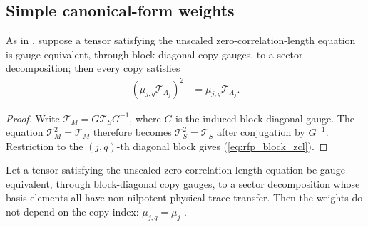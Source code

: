 \subsection{Simple canonical-form weights}

\begin{lemma}
    \label{lem:mpdo_simple_blockwise_zcl_equation}
    \leanok
    As in \cite[Appendix~C.2, lines~1652--1657]{Cirac2016MPDO_arXiv}, suppose a
    tensor satisfying the unscaled zero-correlation-length equation is gauge
    equivalent, through block-diagonal copy gauges, to a sector decomposition;
    then every copy satisfies
    \begin{align}
        (\mu_{j,q}\mathcal T_{A_j})^2
         & =\mu_{j,q}\mathcal T_{A_j}.
        \label{eq:rfp_block_zcl}
    \end{align}
\end{lemma}

\begin{proof}\leanok
    Write $\mathcal T_M=G\mathcal T_SG^{-1}$, where $G$ is the induced
    block-diagonal gauge. The equation $\mathcal T_M^2=\mathcal T_M$ therefore
    becomes $\mathcal T_S^2=\mathcal T_S$ after conjugation by $G^{-1}$.
    Restriction to the $(j,q)$-th diagonal block gives
    (\ref{eq:rfp_block_zcl}).
\end{proof}

\begin{theorem}
    \label{thm:mpdo_simple_weight_copy_independent}
    \leanok
    Let a tensor satisfying the unscaled zero-correlation-length equation be
    gauge equivalent, through block-diagonal copy gauges, to a sector
    decomposition whose basis elements all have non-nilpotent physical-trace
    transfer. Then the weights do not depend on the copy index:
    $\mu_{j,q}=\mu_{j}$
    \cite[Appendix~C.2, lines~1646--1661]{Cirac2016MPDO_arXiv}.
\end{theorem}

